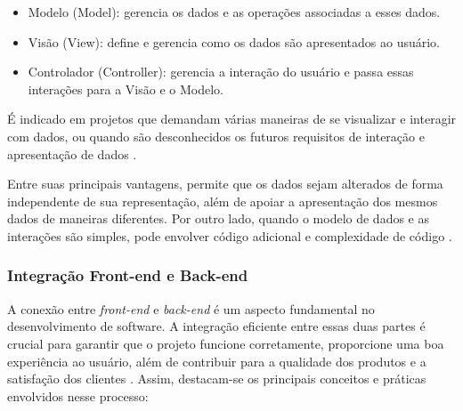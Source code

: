 \begin{itemize}
    \item Modelo (Model): gerencia os dados e as operações associadas a esses dados.
    \item Visão (View): deﬁne e gerencia como os dados são apresentados ao usuário.
    \item Controlador (Controller): gerencia a interação do usuário e passa essas interações para a Visão e o Modelo.
\end{itemize}

É indicado em projetos que demandam várias maneiras de se visualizar e interagir com dados, ou quando são desconhecidos os futuros requisitos de interação e apresentação de dados \cite{sommerville2011engenharia}.

Entre suas principais vantagens, permite que os dados sejam alterados de forma independente de sua representação, além de apoiar a apresentação dos mesmos dados de maneiras diferentes. Por outro lado, quando o modelo de dados e as interações são simples, pode envolver código adicional e complexidade de código \cite{sommerville2011engenharia}.

\subsubsection{Integração Front-end e Back-end}

A conexão entre \textit{front-end} e \textit{back-end} é um aspecto fundamental no desenvolvimento de software. A integração eficiente entre essas duas partes é crucial para garantir que o projeto funcione corretamente, proporcione uma boa experiência ao usuário, além de contribuir para a qualidade dos produtos e a satisfação dos clientes \cite{da2024guia}. Assim, destacam-se os principais conceitos e práticas envolvidos nesse processo:

